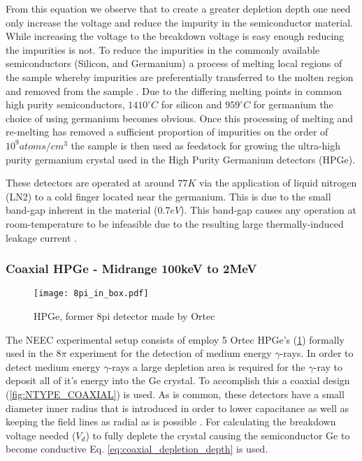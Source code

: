 \documentclass[jon_ringuette_thesis_proposal.tex]{subfiles}
\begin{document}
    From this equation we observe that to create a greater depletion depth one need only increase the voltage and reduce the impurity in the semiconductor material.
    While increasing the voltage to the breakdown voltage is easy enough reducing the impurities is not.
    To reduce the impurities in the commonly available semiconductors (Silicon, and Germanium) a process of melting local regions of the sample whereby impurities are preferentially transferred to the molten region and removed from the sample \cite{KNOLL}.
    Due to the differing melting points in common high purity semiconductors, $1410 ^{\circ} C$ for silicon and $959 ^{\circ} C$ for germanium the choice of using germanium becomes obvious.
    Once this processing of melting and re-melting has removed a sufficient proportion of impurities on the order of $10^9 atoms/cm^3$ the sample is then used as feedstock for growing the ultra-high purity germanium crystal used in the High Purity Germanium detectors (HPGe).

    These detectors are operated at around $77K$ via the application of liquid nitrogen (LN2) to a cold finger located near the germanium.
    This is due to the small band-gap inherent in the material ($0.7 eV$).
    This band-gap causes any operation at room-temperature to be infeasible due to the resulting large thermally-induced leakage current \cite{KNOLL}.

    \subsubsection{Coaxial HPGe - Midrange 100keV to 2MeV}

    \begin{figure}[H]
        \begin{center}
            \texttt{[image: 8pi\_in\_box.pdf]}
        \end{center}
        \caption{\small HPGe, former 8pi detector made by Ortec}
        \label{fig:8PI_BOX}
    \end{figure}

    The NEEC experimental setup consists of employ 5 Ortec HPGe's (\ref{fig:8PI_BOX}) formally used in the 8$\pi$ experiment for the detection of medium energy $\gamma$-rays.
    In order to detect medium energy $\gamma$-rays a large depletion area is required for the $\gamma$-ray to deposit all of it's energy into the Ge crystal.
    To accomplish this a coaxial design (\ref{fig:NTYPE_COAXIAL}) is used.
    As is common, these detectors have a small diameter inner radius that is introduced in order to lower capacitance as well as keeping the field lines as radial as is possible \cite{KNOLL}.
    For calculating the breakdown voltage needed ($V_d$) to fully deplete the crystal causing the semiconductor Ge to become conductive Eq. \ref{eq:coaxial_depletion_depth} is used.
\end{document}
